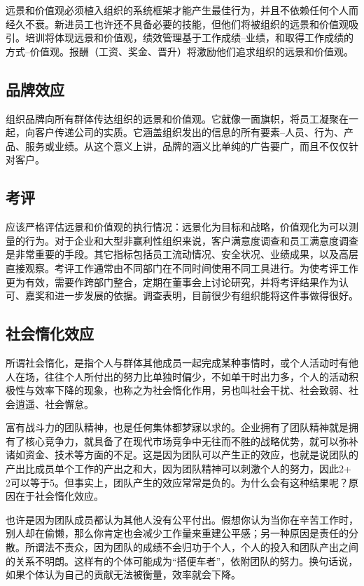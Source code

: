 \documentclass[11pt]{ctexart}
\begin{document}
远景和价值观必须植入组织的系统框架才能产生最佳行为，并且不依赖任何个人而经久不衰。新进员工也许还不具备必要的技能，但他们将被组织的远景和价值观吸引。培训将体现远景和价值观，绩效管理基于工作成绩--业绩，和取得工作成绩的方式--价值观。报酬（工资、奖金、晋升）将激励他们追求组织的远景和价值观。
\subsection{品牌效应}
\label{sec-86-6}


组织品牌向所有群体传达组织的远景和价值观。它就像一面旗帜，将员工凝聚在一起，向客户传递公司的实质。它涵盖组织发出的信息的所有要素--人员、行为、产品、服务或业绩。从这个意义上讲，品牌的涵义比单纯的广告要广，而且不仅仅针对客户。
\subsection{考评}
\label{sec-86-7}


应该严格评估远景和价值观的执行情况：远景化为目标和战略，价值观化为可以测量的行为。对于企业和大型非赢利性组织来说，客户满意度调查和员工满意度调查是非常重要的手段。其它指标包括员工流动情况、安全状况、业绩成果，以及高层直接观察。考评工作通常由不同部门在不同时间使用不同工具进行。为使考评工作更为有效，需要作跨部门整合，定期在董事会上讨论研究，并将考评结果作为认可、嘉奖和进一步发展的依据。调查表明，目前很少有组织能将这件事做得很好。
\subsection{社会惰化效应}
\label{sec-86-8}


所谓社会惰化，是指个人与群体其他成员一起完成某种事情时，或个人活动时有他人在场，往往个人所付出的努力比单独时偏少，不如单干时出力多，个人的活动积极性与效率下降的现象，也称之为社会惰化作用，另也叫社会干扰、社会致弱、社会逍遥、社会懈怠。

富有战斗力的团队精神，也是任何集体都梦寐以求的。企业拥有了团队精神就是拥有了核心竞争力，就具备了在现代市场竞争中无往而不胜的战略优势，就可以弥补诸如资金、技术等方面的不足。这是因为团队可以产生正的效应，也就是说团队的产出比成员单个工作的产出之和大，因为团队精神可以刺激个人的努力，因此2+ 2可以等于5。但事实上，团队产生的效应常常是负的。为什么会有这种结果呢？原因在于社会惰化效应。

也许是因为团队成员都认为其他人没有公平付出。假想你认为当你在辛苦工作时，别人却在偷懒，那么你肯定也会减少工作量来重建公平感；另一种原因是责任的分散。所谓法不责众，因为团队的成绩不会归功于个人，个人的投入和团队产出之间的关系不明朗。这样有的个体可能成为“搭便车者”，依附团队的努力。换句话说，如果个体认为自己的贡献无法被衡量，效率就会下降。
\end{document}
